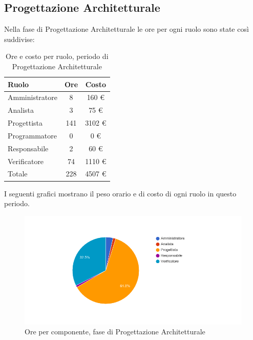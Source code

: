 \subsection{Progettazione Architetturale}
Nella fase di Progettazione Architetturale le ore per ogni ruolo sono state cos\`i suddivise:

\begin{table}[H]
	\centering
	\begin{tabular}{ l c c }
		\textbf{Ruolo} & \textbf{Ore} & \textbf{Costo} \\
		\hline
		Amministratore & 8 & 160 \euro{} \\
		Analista & 3 & 75 \euro{} \\
		Progettista & 141 & 3102 \euro{} \\
		Programmatore & 0 & 0 \euro{} \\
		Responsabile & 2 & 60 \euro{} \\
		Verificatore & 74 & 1110 \euro{} \\
		\hline
		Totale & 228 & 4507 \euro{} \\
		\hline
	\end{tabular}
	\caption{Ore e costo per ruolo, periodo di Progettazione Architetturale}
\end{table}

I seguenti grafici mostrano il peso orario e di costo di ogni ruolo in questo periodo.

\begin{figure}[H]
  \begin{center}
    \includegraphics[width=15cm]{res/img/prospettoEconomico/orePerRuoloProgettazioneArchitetturale.png}
  \caption{Ore per componente, fase di Progettazione Architetturale}
  \end{center} 
\end{figure}  

